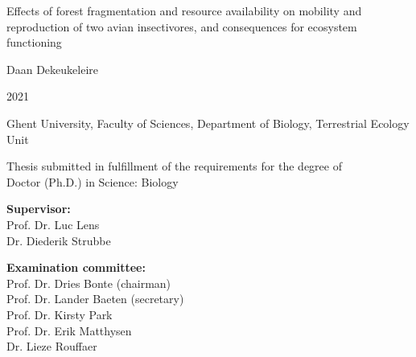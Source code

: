 \documentclass[10pt, twoside]{book} %
\begin{document}
	
	\newpage{\thispagestyle{empty}\cleardoublepage}
	\color{black}
	\newpage 
	\thispagestyle{empty}
\begin{center}
			\thispagestyle{empty}
			
			\vspace*{3.00cm}
			
			{\Large Effects of forest fragmentation and resource availability on mobility and reproduction of two avian insectivores, and consequences for ecosystem functioning}

			
			\vspace{7.5 cm}
			
			{\normalsize Daan Dekeukeleire} 
			
			\vspace{1.0 cm}
			
			{\normalsize 2021}	
			
			\vspace{2.0 cm}
			
			{\footnotesize Ghent University, Faculty of Sciences, Department of Biology, Terrestrial Ecology Unit}
			
			\vspace{0.5cm}
			
			{\footnotesize Thesis submitted in fulfillment of the requirements for the degree of\\
 			Doctor (Ph.D.) in Science: Biology}

\end{center}
\newpage
		
	\color{black}
	\newpage 
	\thispagestyle{empty}

		
	{\small \noindent \textbf{Supervisor:} \\
			\hspace{10mm}Prof. Dr. Luc Lens\\
			\hspace{10mm}Dr. Diederik Strubbe}\\

	\vspace*{1.0cm}
	
	{\small \noindent \textbf{Examination committee:}\\
		\hspace{10mm}Prof. Dr. Dries Bonte (chairman) \\
		\hspace{10mm}Prof. Dr. Lander Baeten (secretary)\\
		\hspace{10mm}Prof. Dr. Kirsty Park\\
		\hspace{10mm}Prof. Dr. Erik Matthysen\\
		\hspace{10mm}Dr. Lieze Rouffaer} \\
	
\end{document}
